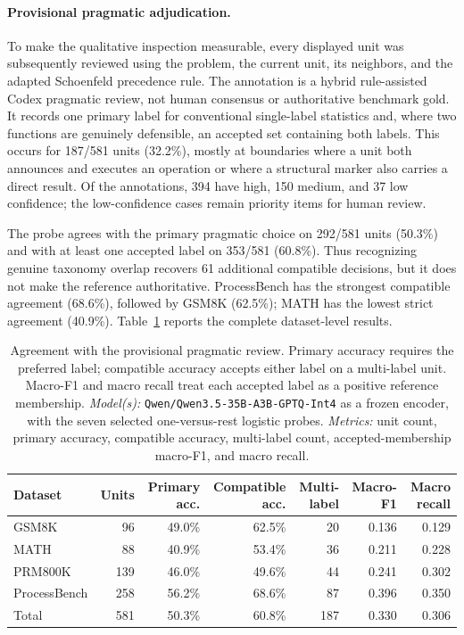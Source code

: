 \documentclass[manuscript,screen,review]{jair}
\newcommand{\modelmetrics}[2]{\textit{Model(s):} #1. \textit{Metrics:} #2.}
\begin{document}
\paragraph{Provisional pragmatic adjudication.}
To make the qualitative inspection measurable, every displayed unit was
subsequently reviewed using the problem, the current unit, its neighbors, and
the adapted Schoenfeld precedence rule.  The annotation is a hybrid
rule-assisted Codex pragmatic review, not human consensus or authoritative
benchmark gold.  It records one primary label for conventional single-label
statistics and, where two functions are genuinely defensible, an accepted
set containing both labels.  This occurs for 187/581 units (32.2\%), mostly
at boundaries where a unit both announces and executes an operation or where
a structural marker also carries a direct result.  Of the annotations, 394
have high, 150 medium, and 37 low confidence; the low-confidence cases remain
priority items for human review.

The probe agrees with the primary pragmatic choice on 292/581 units (50.3\%)
and with at least one accepted label on 353/581 (60.8\%).  Thus recognizing
genuine taxonomy overlap recovers 61 additional compatible decisions, but it
does not make the reference authoritative.  ProcessBench has the strongest
compatible agreement (68.6\%), followed by GSM8K (62.5\%); MATH has the
lowest strict agreement (40.9\%).  Table~\ref{tab:schoenfeld-pragmatic-transfer}
reports the complete dataset-level results.

\begin{table}[t]
\centering
\caption{Agreement with the provisional pragmatic review.  Primary accuracy
requires the preferred label; compatible accuracy accepts either label on a
multi-label unit.  Macro-F1 and macro recall treat each accepted label as a
positive reference membership.  \modelmetrics{
\texttt{Qwen/Qwen3.5-35B-A3B-GPTQ-Int4} as a frozen encoder, with the seven
selected one-versus-rest logistic probes}{unit count, primary accuracy,
compatible accuracy, multi-label count, accepted-membership macro-F1, and
macro recall}}
\label{tab:schoenfeld-pragmatic-transfer}
\begin{tabular}{lrrrrrr}
\toprule
Dataset & Units & Primary acc. & Compatible acc. & Multi-label & Macro-F1 & Macro recall \\
\midrule
GSM8K        &  96 & 49.0\% & 62.5\% & 20 & 0.136 & 0.129 \\
MATH         &  88 & 40.9\% & 53.4\% & 36 & 0.211 & 0.228 \\
PRM800K      & 139 & 46.0\% & 49.6\% & 44 & 0.241 & 0.302 \\
ProcessBench & 258 & 56.2\% & 68.6\% & 87 & 0.396 & 0.350 \\
\midrule
Total        & 581 & 50.3\% & 60.8\% & 187 & 0.330 & 0.306 \\
\bottomrule
\end{tabular}
\end{table}
\end{document}
